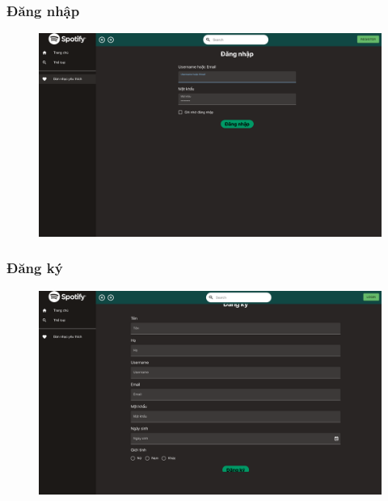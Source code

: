 \documentclass[a4paper]{article}
\begin{document}
\subsubsection{Đăng nhập}
\begin{figure}[h!]
\begin{center}
\includegraphics[width=12cm]{login.png}
\end{center}
\end{figure}

\subsubsection{Đăng ký}
\begin{figure}[h!]
\begin{center}
\includegraphics[width=12cm]{register.png}
\end{center}
\end{figure}
\newpage
\end{document}
